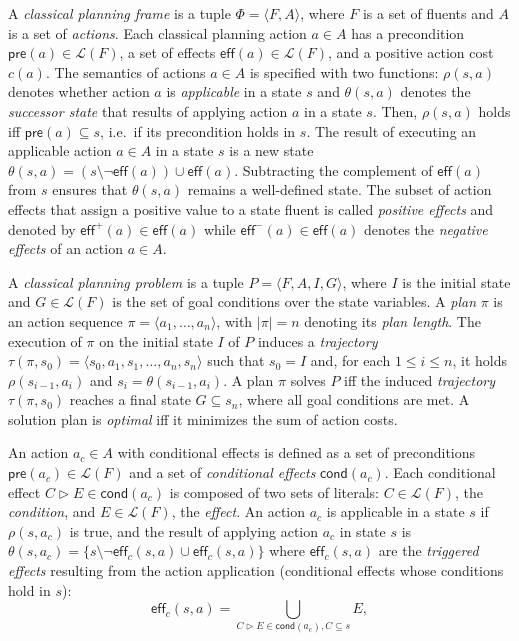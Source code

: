 \documentclass{article}
\newcommand{\tup}[1]{{\langle #1 \rangle}}
\newcommand{\pre}{\mathsf{pre}}     %
\newcommand{\eff}{\mathsf{eff}}     %
\newcommand{\cond}{\mathsf{cond}}   %
\begin{document}
A {\em classical planning frame} is a tuple $\Phi=\tup{F,A}$, where $F$ is a set of fluents and $A$ is a set of \emph{actions}. Each classical planning action $a\in A$ has a precondition $\pre(a)\in\mathcal{L}(F)$, a set of effects $\eff(a)\in\mathcal{L}(F)$, and a positive action cost $c(a)$. The semantics of actions $a\in A$ is specified with two functions: $\rho(s,a)$ denotes whether action $a$ is {\em applicable} in a state $s$ and $\theta(s,a)$ denotes the {\em successor state} that results of applying action $a$ in a state $s$. Then, $\rho(s,a)$ holds iff $\pre(a)\subseteq s$, i.e.~if its precondition holds in $s$. The result of executing an applicable action $a\in A$ in a state $s$ is a new state $\theta(s,a)=(s\setminus \neg\eff(a))\cup\eff(a)$. Subtracting the complement of $\eff(a)$ from $s$ ensures that $\theta(s,a)$ remains a well-defined state. The subset of action effects that assign a positive value to a state fluent is called {\em positive effects} and denoted by $\eff^+(a)\in \eff(a)$ while $\eff^-(a)\in \eff(a)$ denotes the {\em negative effects} of an action $a\in A$.

A {\em classical planning problem} is a tuple $P=\tup{F,A,I,G}$, where $I$ is the initial state and $G\in\mathcal{L}(F)$ is the set of goal conditions over the state variables. A {\em plan} $\pi$ is an action sequence $\pi=\tup{a_1, \ldots, a_n}$, with $|\pi|=n$ denoting its {\em plan length}. The execution of $\pi$ on the initial state $I$ of $P$ induces a {\em trajectory} $\tau(\pi,s_0)=\tup{s_0, a_1, s_1, \ldots, a_n, s_n}$ such that $s_0=I$ and, for each {\small $1\leq i\leq n$}, it holds $\rho(s_{i-1},a_i)$ and $s_i=\theta(s_{i-1},a_i)$. A plan $\pi$ solves $P$ iff the induced {\em trajectory} $\tau(\pi,s_0)$ reaches a final state $G \subseteq s_n$, where all goal conditions are met. A solution plan is {\em optimal} iff it minimizes the sum of action costs.

An action $a_c\in A$ with conditional effects is defined as a set of preconditions $\pre(a_c)\in\mathcal{L}(F)$ and a set of {\em conditional effects} $\cond(a_c)$. Each conditional effect $C\rhd E\in\cond(a_c)$ is composed of two sets of literals: $C\in\mathcal{L}(F)$, the {\em condition}, and $E\in\mathcal{L}(F)$, the {\em effect}. An action $a_c$ is applicable in a state $s$ if $\rho(s,a_c)$ is true, and the result of applying action $a_c$ in state $s$ is $\theta(s,a_c)=\{s\setminus\neg\eff_c(s,a)\cup\eff_c(s,a)\}$ where $\eff_c(s,a)$ are the {\em triggered effects} resulting from the action application (conditional effects whose conditions hold in $s$):
\[
\eff_c(s,a)=\bigcup_{C\rhd E\in\cond(a_c),C\subseteq s} E,
\]
\end{document}
